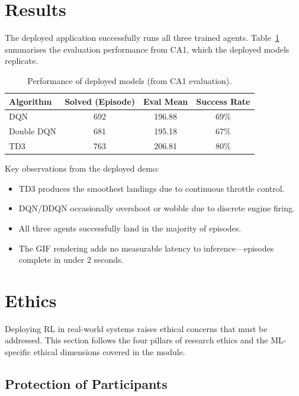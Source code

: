\documentclass[11pt,a4paper]{article}
\begin{document}
\section{Results}

The deployed application successfully runs all three trained agents. Table~\ref{tab:results} summarises the evaluation performance from CA1, which the deployed models replicate.

\begin{table}[H]
\centering
\begin{tabular}{lccc}
\toprule
\textbf{Algorithm} & \textbf{Solved (Episode)} & \textbf{Eval Mean} & \textbf{Success Rate} \\
\midrule
DQN & 692 & 196.88 & 69\% \\
Double DQN & 681 & 195.18 & 67\% \\
TD3 & 763 & 206.81 & 80\% \\
\bottomrule
\end{tabular}
\caption{Performance of deployed models (from CA1 evaluation).}
\label{tab:results}
\end{table}

Key observations from the deployed demo:
\begin{itemize}
    \item TD3 produces the smoothest landings due to continuous throttle control.
    \item DQN/DDQN occasionally overshoot or wobble due to discrete engine firing.
    \item All three agents successfully land in the majority of episodes.
    \item The GIF rendering adds no measurable latency to inference---episodes complete in under 2 seconds.
\end{itemize}

\section{Ethics}

Deploying RL in real-world systems raises ethical concerns that must be addressed. This section follows the four pillars of research ethics and the ML-specific ethical dimensions covered in the module.

\subsection{Protection of Participants}
\end{document}
